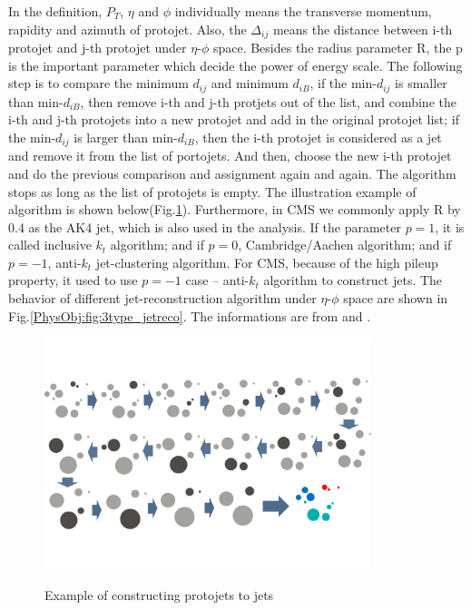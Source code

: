 		In the definition, $P_{T}$, $\eta$ and $\phi$ individually means the transverse momentum, rapidity and azimuth of protojet. Also, the $\Delta_{ij}$ means the distance between i-th protojet and j-th protojet under $\eta$-$\phi$ space. Besides the radius parameter R, the p is the important parameter which decide the power of energy scale. The following step is to compare the minimum $d_{ij}$ and minimum $d_{iB}$, if the min-$d_{ij}$ is smaller than min-$d_{iB}$, then remove i-th and j-th protjets out of the list, and combine the i-th and j-th protojets into a new protojet and add in the original protojet list; if the min-$d_{ij}$ is larger than min-$d_{iB}$, then the i-th protojet is considered as a jet and remove it from the list of portojets. And then, choose the new i-th protojet and do the previous comparison and assignment again and again. The algorithm stops as long as the list of protojets is empty. The illustration example of algorithm is shown below(Fig.\ref{PhysObj:fig:jet_algo}). Furthermore, in CMS we commonly apply R by 0.4 as the AK4 jet, which is also used in the analysis. If the parameter $p=1$, it is called inclusive $k_{t}$ algorithm; and if $p=0$, Cambridge/Aachen algorithm; and if $p=-1$, anti-$k_{t}$ jet-clustering algorithm. For CMS, because of the high pileup property, it used to use $p=-1$ case -- anti-$k_{t}$ algorithm to construct jets. The behavior of different jet-reconstruction algorithm under $\eta$-$\phi$ space are shown in Fig.\ref{PhysObj:fig:3type_jetreco}. The informations are from \cite{Atkin_2015} and \cite{Cacciari_2008}.

		\begin{figure}[H]
		\centering{}
	    	\includegraphics[width=0.85\textwidth]{Figures/PhysObj/jet_algo.pdf}\\
		\caption{Example of constructing protojets to jets}
		\label{PhysObj:fig:jet_algo}
		\end{figure}
		\FloatBarrier

